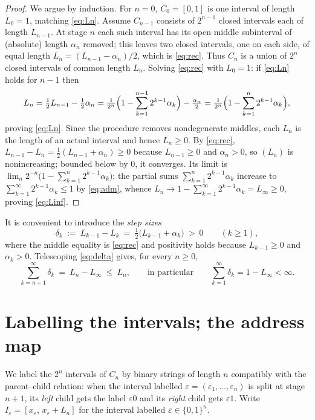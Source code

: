 \documentclass{amsart}
\theoremstyle{definition}
\theoremstyle{remark}
\begin{document}
\begin{proof}
We argue by induction. For $n=0$, $C_0=[0,1]$ is one interval of length $L_0=1$,
matching \eqref{eq:Ln}. Assume $C_{n-1}$ consists of $2^{n-1}$ closed intervals
each of length $L_{n-1}$. At stage $n$ each such interval has its open middle
subinterval of (absolute) length $\alpha_n$ removed; this leaves two closed
intervals, one on each side, of equal length $L_n=(L_{n-1}-\alpha_n)/2$, which is
\eqref{eq:rec}. Thus $C_n$ is a union of $2^{n}$ closed intervals of common length
$L_n$. Solving \eqref{eq:rec} with $L_0=1$: if \eqref{eq:Ln} holds for $n-1$ then
\[
L_n=\tfrac12 L_{n-1}-\tfrac12\alpha_n
=\tfrac{1}{2^{n}}\Bigl(1-\sum_{k=1}^{n-1}2^{k-1}\alpha_k\Bigr)-\tfrac{\alpha_n}{2}
=\tfrac{1}{2^{n}}\Bigl(1-\sum_{k=1}^{n}2^{k-1}\alpha_k\Bigr),
\]
proving \eqref{eq:Ln}. Since the procedure removes nondegenerate middles, each
$L_n$ is the length of an actual interval and hence $L_n\ge0$. By \eqref{eq:rec},
$L_{n-1}-L_n=\tfrac12(L_{n-1}+\alpha_n)\ge0$ because $L_{n-1}\ge0$ and
$\alpha_n>0$, so $(L_n)$ is nonincreasing; bounded below by $0$, it converges. Its
limit is $\lim_n 2^{-n}\bigl(1-\sum_{k=1}^n 2^{k-1}\alpha_k\bigr)$; the partial
sums $\sum_{k=1}^n 2^{k-1}\alpha_k$ increase to $\sum_{k=1}^\infty
2^{k-1}\alpha_k\le1$ by \eqref{eq:adm}, whence
$L_n\to 1-\sum_{k=1}^{\infty}2^{k-1}\alpha_k=L_\infty\ge0$, proving \eqref{eq:Linf}.
\end{proof}

It is convenient to introduce the \emph{step sizes}
\begin{equation}\label{eq:delta}
\delta_k\ :=\ L_{k-1}-L_k\ =\ \tfrac12\bigl(L_{k-1}+\alpha_k\bigr)\ >\ 0
\qquad(k\ge1),
\end{equation}
where the middle equality is \eqref{eq:rec} and positivity holds because
$L_{k-1}\ge0$ and $\alpha_k>0$. Telescoping \eqref{eq:delta} gives, for every
$n\ge0$,
\begin{equation}\label{eq:tail}
\sum_{k=n+1}^{\infty}\delta_k\ =\ L_n-L_\infty\ \le\ L_n,
\qquad\text{in particular}\qquad
\sum_{k=1}^{\infty}\delta_k=1-L_\infty<\infty .
\end{equation}

\section{Labelling the intervals; the address map}

We label the $2^n$ intervals of $C_n$ by binary strings of length $n$ compatibly
with the parent--child relation: when the interval labelled
$\varepsilon=(\varepsilon_1,\dots,\varepsilon_n)$ is split at stage $n+1$, its
\emph{left} child gets the label $\varepsilon0$ and its \emph{right} child gets
$\varepsilon1$. Write $I_\varepsilon=[x_\varepsilon,\,x_\varepsilon+L_n]$ for the
interval labelled $\varepsilon\in\{0,1\}^n$.
\end{document}
